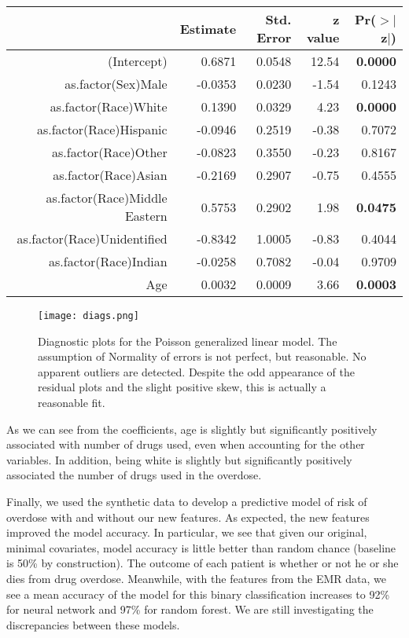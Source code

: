 \documentclass{article}
\begin{document}
\begin{table}[ht]
\centering
\begin{tabular}{rrrrr}
  \hline
 & Estimate & Std. Error & z value & Pr($>$$|$z$|$) \\ 
  \hline
(Intercept) & 0.6871 & 0.0548 & 12.54 & {\bf 0.0000} \\ 
  as.factor(Sex)Male & -0.0353 & 0.0230 & -1.54 & 0.1243 \\ 
  as.factor(Race)White & 0.1390 & 0.0329 & 4.23 & {\bf 0.0000} \\ 
  as.factor(Race)Hispanic & -0.0946 & 0.2519 & -0.38 & 0.7072 \\ 
  as.factor(Race)Other & -0.0823 & 0.3550 & -0.23 & 0.8167 \\ 
  as.factor(Race)Asian & -0.2169 & 0.2907 & -0.75 & 0.4555 \\ 
  as.factor(Race)Middle Eastern & 0.5753 & 0.2902 & 1.98 & {\bf 0.0475} \\ 
  as.factor(Race)Unidentified & -0.8342 & 1.0005 & -0.83 & 0.4044 \\ 
  as.factor(Race)Indian & -0.0258 & 0.7082 & -0.04 & 0.9709 \\ 
  Age & 0.0032 & 0.0009 & 3.66 & {\bf 0.0003} \\ 
   \hline
\end{tabular}
\label{table:glmSum}
\end{table}

\begin{figure}[h]
\centering
\texttt{[image: diags.png]}
\caption{Diagnostic plots for the Poisson generalized linear model. The assumption of Normality of errors is not perfect, but reasonable. No apparent outliers are detected. Despite the odd appearance of the residual plots and the slight positive skew, this is actually a reasonable fit.}
\label{fig:diags}
\end{figure}

As we can see from the coefficients, age is slightly but significantly positively associated with number of drugs used, even when accounting for the other variables. In addition, being white is slightly but significantly positively associated the number of drugs used in the overdose.

Finally, we used the synthetic data to develop a predictive model of risk of overdose with and without our new features. As expected, the new features improved the model accuracy. In particular, we see that given our original, minimal covariates, model accuracy is little better than random chance (baseline is 50\% by construction). The outcome of each patient is whether or not he or she dies from drug overdose. Meanwhile, with the features from the EMR data, we see a mean accuracy of the model for this binary classification increases to 92\% for neural network and 97\% for random forest. We are still investigating the discrepancies between these models.
\end{document}
